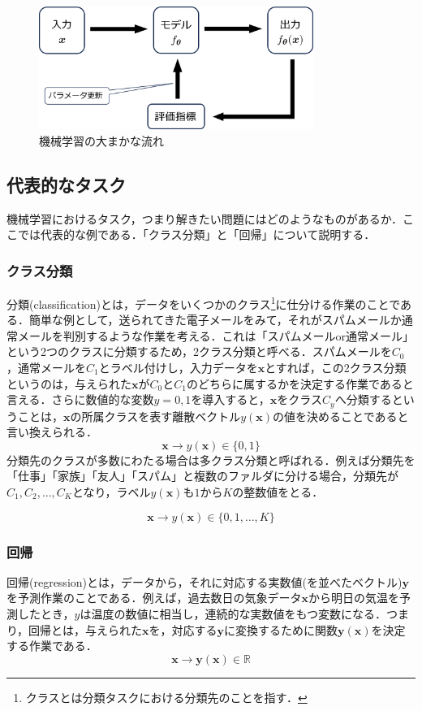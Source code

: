 \documentclass[a4paper,11pt]{jsreport}
\begin{document}
\begin{figure}[H]
  \begin{center}
    \includegraphics[height=4cm]{image/機械学習概要図.png}
    \caption{機械学習の大まかな流れ}
  \end{center}
\end{figure}

\subsection{代表的なタスク}
機械学習におけるタスク，つまり解きたい問題にはどのようなものがあるか．ここでは代表的な例である．「クラス分類」と「回帰」について説明する．
\subsubsection*{クラス分類}
分類(classification)とは，データをいくつかのクラス\footnote{クラスとは分類タスクにおける分類先のことを指す．}に仕分ける作業のことである．簡単な例として，送られてきた電子メールをみて，それがスパムメールか通常メールを判別するような作業を考える．これは「スパムメールor通常メール」という2つのクラスに分類するため，2クラス分類と呼べる．スパムメールを$C_0$，通常メールを$C_1$とラベル付けし，入力データを$\bm{x}$とすれば，この2クラス分類というのは，与えられた$\bm{x}$が$C_0$と$C_1$のどちらに属するかを決定する作業であると言える．さらに数値的な変数$y = 0, 1$を導入すると，$\bm{x}$をクラス$C_{y}$へ分類するということは，$\bm{x}$の所属クラスを表す離散ベクトル$y(\bm{x})$の値を決めることであると言い換えられる．
\begin{equation}
  \bm{x} \longrightarrow y(\bm{x}) \in \{0, 1\}
\end{equation}
分類先のクラスが多数にわたる場合は多クラス分類と呼ばれる．例えば分類先を「仕事」「家族」「友人」「スパム」と複数のファルダに分ける場合，分類先が$C_1,C_2,\dots,C_K$となり，ラベル$y(\bm{x})$も$1$から$K$の整数値をとる．\par
\begin{equation}
  \bm{x} \longrightarrow y(\bm{x}) \in \{0, 1, \dots, K\}
\end{equation}
\subsubsection*{回帰}
回帰(regression)とは，データから，それに対応する実数値(を並べたベクトル)$\bm{y}$を予測作業のことである．例えば，過去数日の気象データ$\bm{x}$から明日の気温を予測したとき，$y$は温度の数値に相当し，連続的な実数値をもつ変数になる．つまり，回帰とは，与えられた$\bm{x}$を，対応する$\bm{y}$に変換するために関数$\bm{y}(\bm{x})$を決定する作業である．
\begin{equation}
  \bm{x} \longrightarrow \bm{y}(\bm{x}) \in \mathbb{R}
\end{equation}
\end{document}
